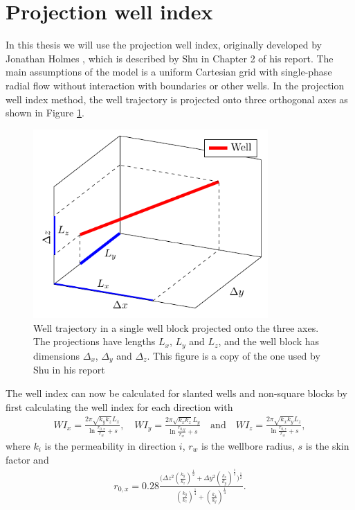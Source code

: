 \section{Projection well index}
% 
In this thesis we will use the projection well index, 
originally developed by Jonathan Holmes \cite{Holmes},
which is described by Shu in Chapter 2 of his report.
%
The main assumptions of the model is a uniform Cartesian 
grid with single-phase radial flow without interaction 
with boundaries or other wells. In the projection well
index method, the well trajectory is projected onto three
orthogonal axes as shown in Figure \ref{fig:well_index}.
%
\begin{figure}[H]
	\centering
	\includegraphics[width=0.80\textwidth]{figures/well_index/well_index.pdf}
	\caption{Well trajectory in a single well block projected 
			 onto the three axes. The projections have lengths $L_x$, $L_y$
			 and $L_z$, and the well block has dimensions $\Delta_x$, $\Delta_y$
			 and $\Delta_z$. This figure is a copy of the one used by Shu in
			 his report \cite{Shu_Paper}}
	\label{fig:well_index}
\end{figure}
%
The well index can now be calculated for slanted wells and
non-square blocks by first calculating the well index for
each direction with
%
\begin{align}
WI_x = \frac{2 \pi \sqrt{k_y k_z} L_x}{\ln \frac{r_{0,x}}{r_w} + s}, \quad WI_y = \frac{2 \pi \sqrt{k_x k_z} L_y}{\ln \frac{r_{0,y}}{r_w} + s}
\quad \text{and} \quad WI_z = \frac{2 \pi \sqrt{k_x k_y} L_z}{\ln \frac{r_{0,z}}{r_w} + s}, 
\end{align}
%
where $k_i$ is the permeability in direction $i$, $r_w$ is the 
wellbore radius, $s$ is the skin factor and
%
\begin{align}
r_{0,x} = 0.28 \frac{ \bigg( \Delta z^2 \left( \frac{k_y}{k_z} \right)^{\frac{1}{2}} +  \Delta y^2 \left( \frac{k_z}{k_y} \right)^{\frac{1}{2}} \bigg)^{\frac{1}{2}} }{ \left( \frac{k_y}{k_z} \right)^{\frac{1}{4}} + \left( \frac{k_z}{k_y} \right)^{\frac{1}{4}} }.
\end{align}
